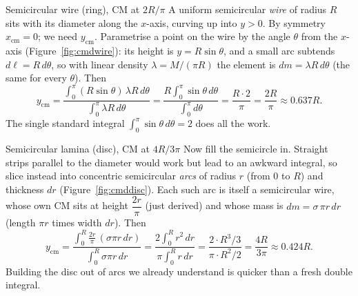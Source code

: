 \begin{derivbox}{Semicircular wire (ring), CM at $2R/\pi$}
A uniform semicircular \emph{wire} of radius $R$ sits with its diameter along the $x$-axis, curving up
into $y>0$. By symmetry $x_{\text{cm}}=0$; we need $y_{\text{cm}}$. Parametrise a point on the wire by the
angle $\theta$ from the $x$-axis (Figure~\ref{fig:cmdwire}): its height is $y=R\sin\theta$, and a small arc subtends
$d\ell=R\,d\theta$, so with linear density $\lambda=M/(\pi R)$ the element is $dm=\lambda R\,d\theta$
(the same for every $\theta$). Then
\[
y_{\text{cm}}=\frac{\int_0^\pi (R\sin\theta)\,\lambda R\,d\theta}{\int_0^\pi \lambda R\,d\theta}
=\frac{R\int_0^\pi \sin\theta\,d\theta}{\int_0^\pi d\theta}
=\frac{R\cdot 2}{\pi}=\frac{2R}{\pi}\approx0.637R.
\]
The single standard integral $\int_0^\pi\sin\theta\,d\theta=2$ does all the work.
\end{derivbox}

\begin{figure}[htbp]
\centering
{}
\end{figure}

\begin{derivbox}{Semicircular lamina (disc), CM at $4R/3\pi$}
Now fill the semicircle in. Straight strips parallel to the diameter would work but lead to an awkward
integral, so slice instead into concentric semicircular
\emph{arcs} of radius $r$ (from $0$ to $R$) and thickness $dr$ (Figure~\ref{fig:cmddisc}). Each such arc is itself a semicircular
wire, whose own CM sits at height $\dfrac{2r}{\pi}$ (just derived) and whose mass is
$dm=\sigma\,\pi r\,dr$ (length $\pi r$ times width $dr$). Then
\[
y_{\text{cm}}=\frac{\int_0^R \frac{2r}{\pi}\,(\sigma\pi r\,dr)}{\int_0^R \sigma\pi r\,dr}
=\frac{2\int_0^R r^2\,dr}{\pi\int_0^R r\,dr}
=\frac{2\cdot R^3/3}{\pi\cdot R^2/2}=\frac{4R}{3\pi}\approx0.424R.
\]
Building the disc out of arcs we already understand is quicker than a fresh double integral.
\end{derivbox}

\begin{figure}[htbp]
\centering
{}
\end{figure}

